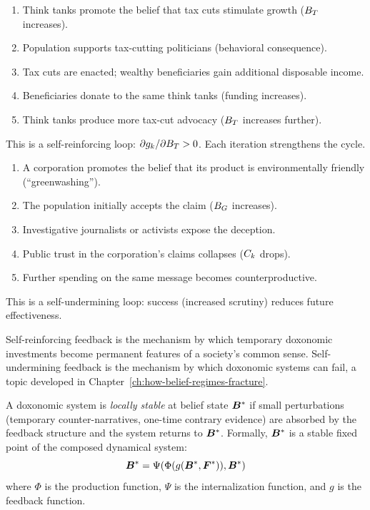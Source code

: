 \begin{example}
\label{ex:tax-cycle}
\begin{enumerate}[nosep]
  \item Think tanks promote the belief that tax cuts stimulate growth ($B_{T}$ increases).
  \item Population supports tax-cutting politicians (behavioral consequence).
  \item Tax cuts are enacted; wealthy beneficiaries gain additional disposable income.
  \item Beneficiaries donate to the same think tanks (funding increases).
  \item Think tanks produce more tax-cut advocacy ($B_{T}$ increases further).
\end{enumerate}
This is a self-reinforcing loop: $\partial g_k / \partial B_{T} > 0$.
Each iteration strengthens the cycle.
\end{example}

\begin{example}
\label{ex:backlash}
\begin{enumerate}[nosep]
  \item A corporation promotes the belief that its product is environmentally friendly (``greenwashing'').
  \item The population initially accepts the claim ($B_{G}$ increases).
  \item Investigative journalists or activists expose the deception.
  \item Public trust in the corporation's claims collapses ($C_{k}$ drops).
  \item Further spending on the same message becomes counterproductive.
\end{enumerate}
This is a self-undermining loop: success (increased scrutiny) reduces future effectiveness.
\end{example}

Self-reinforcing feedback is the mechanism by which temporary doxonomic investments become permanent features of a society's common sense.
Self-undermining feedback is the mechanism by which doxonomic systems can fail, a topic developed in Chapter~\ref{ch:how-belief-regimes-fracture}.

\begin{definition}
\label{def:stability}
A doxonomic system is \emph{locally stable} at belief state $\bm{B}^*$ if small perturbations (temporary counter-narratives, one-time contrary evidence) are absorbed by the feedback structure and the system returns to $\bm{B}^*$.
Formally, $\bm{B}^*$ is a stable fixed point of the composed dynamical system:
\[
  \bm{B}^* = \Psi(\Phi(g(\bm{B}^*, \bm{F}^*)), \bm{B}^*)
\]
where $\Phi$ is the production function, $\Psi$ is the internalization function, and $g$ is the feedback function.
\end{definition}


